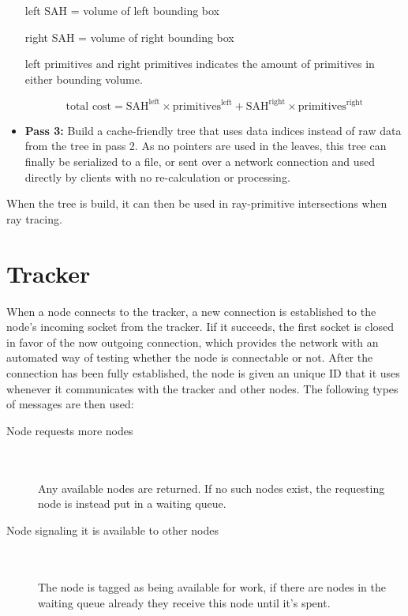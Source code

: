 \begin{itemize}
  left SAH = volume of left bounding box

  right SAH = volume of right bounding box

  left primitives and right primitives indicates the amount of primitives in either bounding volume.

  \begin{equation}
  	\text{total cost} = \text{SAH}^{\text{left}} \times \text{primitives}^{\text{left}} + \text{SAH}^{\text{right}} \times \text{primitives}^{\text{right}}
  \end{equation}

  \item \textbf{Pass 3:} Build a cache-friendly tree that uses data indices instead of raw data from the tree in pass 2. As no pointers are used in the leaves, this tree can finally be serialized to a file, or sent over a network connection and used directly by clients with no re-calculation or processing.
\end{itemize}

When the tree is build, it can then be used in ray-primitive intersections when ray tracing.

\section{Tracker}
When a node connects to the tracker, a new connection is established to the node's incoming socket from the tracker. Iif it succeeds, the first socket is closed in favor of the now outgoing connection, which provides the network with an automated way of testing whether the node is connectable or not. After the connection has been fully established, the node is given an unique ID that it uses whenever it communicates with the tracker and other nodes.
The following types of messages are then used:

\begin{description}
\item[Node requests more nodes] \hfill \\\\
Any available nodes are returned. If no such nodes exist, the requesting node is instead put in a waiting queue.
\item[Node signaling it is available to other nodes] \hfill \\\\
The node is tagged as being available for work, if there are nodes in the waiting queue already they receive this node until it's spent.
\end{description}

